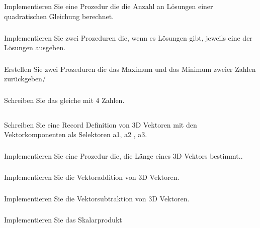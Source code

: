 \documentclass[a4paper,12pt,twoside]{article}
\begin{document}
\subsection{}
\subsubsection{}
Implementieren Sie eine Prozedur die die Anzahl an Lösungen einer quadratischen Gleichung berechnet.
\subsubsection{}
Implementieren Sie zwei Prozeduren die, wenn es Lösungen gibt, jeweils eine der Lösungen ausgeben.
\subsubsection{}
Erstellen Sie zwei Prozeduren die das Maximum und das Minimum zweier Zahlen zurückgeben/
\subsubsection{}
Schreiben Sie das gleiche mit 4 Zahlen.
\subsection{}
\subsubsection{}
Schreiben Sie eine Record Definition von 3D Vektoren mit den Vektorkomponenten als Selektoren a1, a2 , a3.
\subsubsection{}
Implementieren Sie eine Prozedur die, die Länge eines 3D Vektors bestimmt..
\subsubsection{}
Implementieren Sie die Vektoraddition von 3D Vektoren.
\subsubsection{}
Implementieren Sie die Vektorsubtraktion von 3D Vektoren.
\subsubsection{}
Implementieren Sie das Skalarprodukt
\subsection{}
\subsubsection{}
\end{document}
